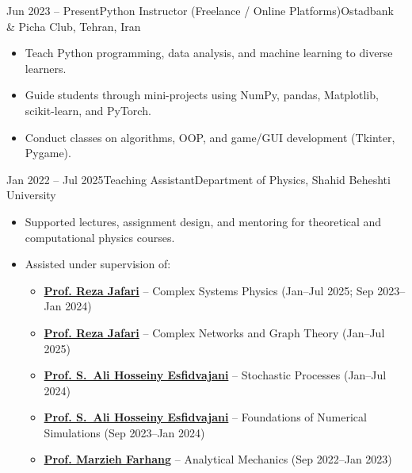 \documentclass[12pt, b4paper]{cv}
\begin{document}
\begin{work}{Jun 2023 -- Present}{Python Instructor (Freelance / Online Platforms)}{Ostadbank \& Picha Club, Tehran, Iran}
\vspace{-0.05in}
\begin{itemize}[leftmargin=*]
    \item Teach Python programming, data analysis, and machine learning to diverse learners.
    \item Guide students through mini-projects using NumPy, pandas, Matplotlib, scikit-learn, and PyTorch.
    \item Conduct classes on algorithms, OOP, and game/GUI development (Tkinter, Pygame).
\end{itemize}
\end{work}


\begin{work}{Jan 2022 -- Jul 2025}{Teaching Assistant}{Department of Physics, Shahid Beheshti University}
\vspace{-0.05in}
\begin{itemize}[leftmargin=*]
        \item Supported lectures, assignment design, and mentoring for theoretical and computational physics courses.
        \item Assisted under supervision of:
        \begin{itemize}
            \item \href{https://complexity.sbu.ac.ir/professor-reza-jafari/}{\textbf{Prof. Reza Jafari}} -- Complex Systems Physics (Jan--Jul 2025; Sep 2023--Jan 2024)
            \item \href{https://complexity.sbu.ac.ir/professor-reza-jafari/}{\textbf{Prof. Reza Jafari}} -- Complex Networks and Graph Theory (Jan--Jul 2025)
            \item \href{https://alihosseiny.com/}{\textbf{Prof. S.~Ali Hosseiny Esfidvajani}} -- Stochastic Processes (Jan--Jul 2024)
            \item \href{https://alihosseiny.com/}{\textbf{Prof. S.~Ali Hosseiny Esfidvajani}} -- Foundations of Numerical Simulations (Sep 2023--Jan 2024)
            \item \href{https://en.sbu.ac.ir/~m_farhang/home}{\textbf{Prof. Marzieh Farhang}} -- Analytical Mechanics (Sep 2022--Jan 2023)
        \end{itemize}
    \end{itemize}
\end{work}
\vspace{-0.15in}
\end{document}
